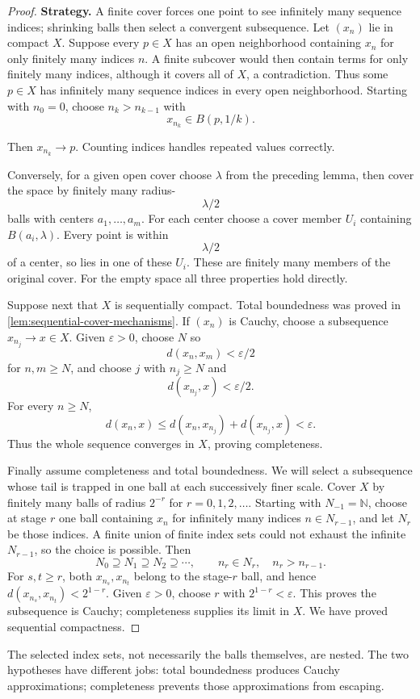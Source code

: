\begin{proof}
\textbf{Strategy.} A finite cover forces one point to see infinitely many
sequence indices; shrinking balls then select a convergent subsequence.
Let $(x_n)$ lie in compact $X$. Suppose every $p\in X$ has an open
neighborhood containing $x_n$ for only finitely many indices $n$.
A finite subcover would then contain terms for only finitely many indices,
although it covers all of $X$, a contradiction. Thus some $p\in X$ has
infinitely many sequence indices in every open neighborhood. Starting
with $n_0=0$, choose $n_k>n_{k-1}$ with
\[
x_{n_k}\in B(p,1/k).
\]

Then $x_{n_k}\to p$. Counting indices handles repeated values correctly.

Conversely, for a given open cover choose $\lambda$ from the preceding
lemma, then cover the space by finitely many radius-
\[
\lambda/2
\]
 balls
with centers $a_1,\ldots,a_m$.
For each center choose a cover member $U_i$ containing $B(a_i,\lambda)$.
Every point is within
\[
\lambda/2
\]
 of a center, so lies in one of these
$U_i$. These are finitely many members of the original cover.
For the empty space all three properties hold directly.

Suppose next that $X$ is sequentially compact. Total boundedness was
proved in \cref{lem:sequential-cover-mechanisms}. If $(x_n)$ is Cauchy,
choose a subsequence $x_{n_j}\to x\in X$. Given $\varepsilon>0$, choose
$N$ so
\[
d(x_n,x_m)<\varepsilon/2
\]
 for $n,m\geq N$, and choose $j$
with $n_j\geq N$ and
\[
d(x_{n_j},x)<\varepsilon/2.
\]
 For every $n\geq N$,
\[
d(x_n,x)\leq d(x_n,x_{n_j})+d(x_{n_j},x)<\varepsilon.
\]
Thus the whole sequence converges in $X$, proving completeness.

Finally assume completeness and total boundedness. We will select a
subsequence whose tail is trapped in one ball at each successively finer
scale. Cover $X$ by finitely many balls of radius $2^{-r}$ for
$r=0,1,2,\ldots$. Starting with $N_{-1}=\mathbb N$, choose at stage $r$
one ball containing $x_n$ for infinitely many indices $n\in N_{r-1}$,
and let $N_r$ be those indices. A finite union of finite index sets could
not exhaust the infinite $N_{r-1}$, so the choice is possible. Then
\[
N_0\supseteq N_1\supseteq N_2\supseteq\cdots,
\qquad n_r\in N_r,\quad n_r>n_{r-1}.
\]
For $s,t\geq r$, both $x_{n_s},x_{n_t}$ belong to the stage-$r$ ball,
and hence $d(x_{n_s},x_{n_t})<2^{1-r}$. Given $\varepsilon>0$, choose
$r$ with $2^{1-r}<\varepsilon$. This proves the subsequence is Cauchy;
completeness supplies its limit in $X$. We have proved sequential compactness.
\end{proof}
The selected index sets, not necessarily the balls themselves, are nested.
The two hypotheses have different jobs: total boundedness produces Cauchy
approximations; completeness prevents those approximations from escaping.

